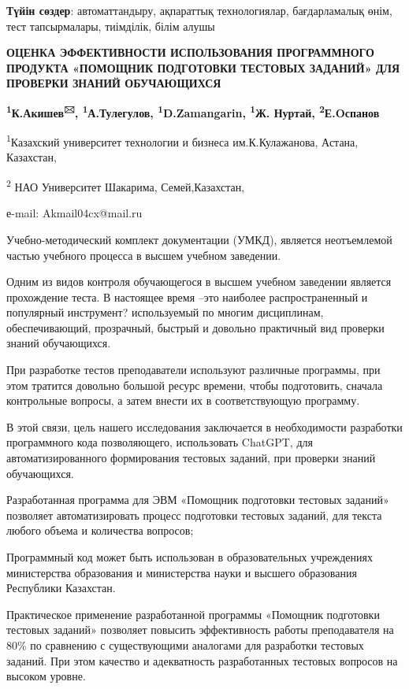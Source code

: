 {\bfseries Түйін сөздер}: автоматтандыру, ақпараттық технологиялар,
бағдарламалық өнім, тест тапсырмалары, тиімділік, білім алушы
\begin{center}

{\bfseries ОЦЕНКА ЭФФЕКТИВНОСТИ ИСПОЛЬЗОВАНИЯ ПРОГРАММНОГО ПРОДУКТА
«ПОМОЩНИК ПОДГОТОВКИ ТЕСТОВЫХ ЗАДАНИЙ» ДЛЯ ПРОВЕРКИ ЗНАНИЙ ОБУЧАЮЩИХСЯ}

{\bfseries \textsuperscript{1}К.Акишев\textsuperscript{🖂},
\textsuperscript{1}А.Тулегулов, \textsuperscript{1}D.Zamangarin,
\textsuperscript{1}Ж. Нуртай, \textsuperscript{2}Е.Oспанов}

\textsuperscript{1}Казахский университет технологии и бизнеса
им.К.Кулажанова, Астана, Казахстан,

\textsuperscript{2} НАО Университет Шакарима, Семей,Казахстан,

е-mail: Akmail04cx@mail.ru
\end{center}

Учебно-методический комплект документации (УМКД), является неотъемлемой
частью учебного процесса в высшем учебном заведении.

Одним из видов контроля обучающегося в высшем учебном заведении является
прохождение теста. В настоящее время --это наиболее распространенный и
популярный инструмент? используемый по многим дисциплинам,
обеспечивающий, прозрачный, быстрый и довольно практичный вид проверки
знаний обучающихся.

При разработке тестов преподаватели используют различные программы, при
этом тратится довольно большой ресурс времени, чтобы подготовить,
сначала контрольные вопросы, а затем внести их в соответствующую
программу.

В этой связи, цель нашего исследования заключается в необходимости
разработки программного кода позволяющего, использовать ChatGPT, для
автоматизированного формирования тестовых заданий, при проверки знаний
обучающихся.

Разработанная программа для ЭВМ «Помощник подготовки тестовых заданий»
позволяет автоматизировать процесс подготовки тестовых заданий, для
текста любого объема и количества вопросов;

Программный код может быть использован в образовательных учреждениях
министерства образования и министерства науки и высшего образования
Республики Казахстан.

Практическое применение разработанной программы «Помощник подготовки
тестовых заданий» позволяет повысить эффективность работы преподавателя
на 80\% по сравнению с существующими аналогами для разработки тестовых
заданий. При этом качество и адекватность разработанных тестовых
вопросов на высоком уровне.

